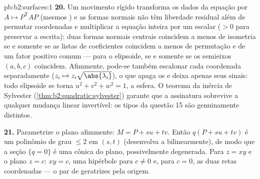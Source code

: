 \begin{solution}{pb:b2:surfaces:1}
\textbf{20.} Um movimento rígido transforma os dados da equação por
$A \mapsto P^{\mathsf T}\!AP$ (mesmos ) e as
formas normais não têm liberdade residual além de permutar
coordenadas e multiplicar a equação inteira por um escalar
($> 0$ para preservar a escrita): duas formas normais centrais
coincidem a menos de isometria se e somente se as listas de coeficientes coincidem a menos de
permutação e de um fator positivo comum --- para o elipsoide,
se e somente se os semieixos $(a, b, c)$ coincidem. Afimmente, pode-se também
escalonar cada coordenada separadamente ($z_i \mapsto z_i\sqrt{\abs
{\lambda_i}}$), o que apaga os  e deixa apenas
seus sinais: todo elipsoide se torna $u^2 + v^2 + w^2 = 1$,
a esfera. O teorema da inércia de Sylvester
(\cref{thm:b2:quadratic:sylvester}) garante que a assinatura
sobrevive a qualquer mudança linear invertível: os tipos  da
questão 15 são genuinamente distintos.

\textbf{21.} Parametrize o plano afimmente: $M = P + su +
tv$. Então $q(P + su + tv)$ é um polinômio de grau $\leq 2$
em $(s, t)$ (desenvolva a  bilinearmente), de modo que a
seção $\{q = 0\}$ é uma cônica do plano, possivelmente
degenerada. Para $z = xy$ e o plano $z = c$: $xy = c$, uma
hipérbole para $c \neq 0$ e, para $c = 0$, as duas retas
coordenadas --- o par de geratrizes pela origem.


\end{solution}
